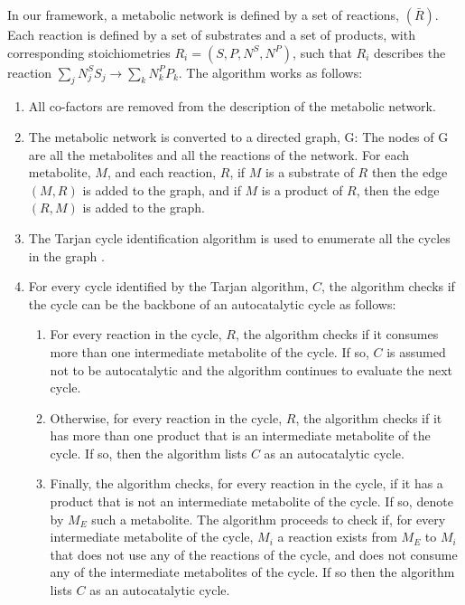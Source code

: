   In our framework, a metabolic network is defined by a set of reactions, $(\bar{R})$.
  Each reaction is defined by a set of substrates and a set of products, with corresponding stoichiometries $R_i=(S,P,N^S,N^P)$, such that $R_i$ describes the reaction $\sum_j N_j^SS_j \rightarrow \sum_k N_k^PP_k$.
  The algorithm works as follows:
  \begin{enumerate}
    \item All co-factors are removed from the description of the metabolic network.
    \item The metabolic network is converted to a directed graph, G:
  The nodes of G are all the metabolites and all the reactions of the network.
  For each metabolite, $M$, and each reaction, $R$, if $M$ is a substrate of $R$ then the edge $(M,R)$ is added to the graph, and if $M$ is a product of $R$, then the edge $(R,M)$ is added to the graph.
    \item The Tarjan cycle identification algorithm is used to enumerate all the cycles in the graph \cite{Tarjan1973-gn}.
    \item For every cycle identified by the Tarjan algorithm, $C$, the algorithm checks if the cycle can be the backbone of an autocatalytic cycle as follows:
        \begin{enumerate}
            \item For every reaction in the cycle, $R$, the algorithm checks if it consumes more than one  intermediate metabolite of the cycle.
              If so, $C$ is assumed not to be autocatalytic and the algorithm continues to evaluate the next cycle.
            \item Otherwise, for every reaction in the cycle, $R$, the algorithm checks if it has more than one product that is an intermediate metabolite of the cycle.
              If so, then the algorithm lists $C$ as an autocatalytic cycle.
            \item Finally, the algorithm checks, for every reaction in the cycle, if it has a product that is not an intermediate metabolite of the cycle.
                If so, denote by $M_E$ such a metabolite.
            The algorithm proceeds to check if, for every intermediate metabolite of the cycle, $M_i$ a reaction exists from $M_E$ to $M_i$ that does not use any of the reactions of the cycle, and does not consume any of the intermediate metabolites of the cycle.
            If so then the algorithm lists $C$ as an autocatalytic cycle.
        \end{enumerate}
  \end{enumerate}

